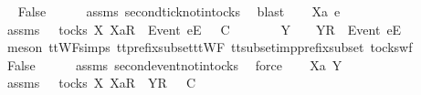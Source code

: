 \ \isamarkupfalse%
\ False\isanewline
\ \ \ \ \isamarkupfalse%
\ assms{\isacharparenleft}{}{\isacharparenright}\ second{\isacharunderscore}tick{\isacharunderscore}notin{\isacharunderscore}tocks\ \isamarkupfalse%
\ blast\isanewline
{}\isamarkupfalse%
\isanewline
\ \ \isamarkupfalse%
\ Xa\ e\ {\isasymrho}\ {\isasymsigma}\isanewline
\ \ \isamarkupfalse%
\ assms{\isacharcolon}\ {\isachardoublequoteopen}{\isasymsigma}\ {\isasymin}\ tocks\ X{\isachardoublequoteclose}\ {\isachardoublequoteopen}{\isacharbrackleft}Xa{\isacharbrackright}\isactrlsub R\ {\isacharhash}\ {\isacharbrackleft}Event\ e{\isacharbrackright}\isactrlsub E\ {\isacharhash}\ {\isasymrho}\ {\isasymsubseteq}\isactrlsub C\ {\isasymsigma}{\isachardoublequoteclose}\isanewline
\ \ \isamarkupfalse%
\ \isamarkupfalse%
\ {\isasymsigma}{\isacharprime}\ Y\ \ {\isachardoublequoteopen}{\isasymsigma}\ {\isacharequal}\ {\isacharbrackleft}Y{\isacharbrackright}\isactrlsub R\ {\isacharhash}\ {\isacharbrackleft}Event\ e{\isacharbrackright}\isactrlsub E\ {\isacharhash}\ {\isasymsigma}{\isacharprime}{\isachardoublequoteclose}\isanewline
\ \ \ \ \isamarkupfalse%
\ {\isacharparenleft}meson\ ttWF{\isachardot}simps{\isacharparenleft}{}{}{\isacharparenright}\ tt{\isacharunderscore}prefix{\isacharunderscore}subset{\isacharunderscore}ttWF\ tt{\isacharunderscore}subset{\isacharunderscore}imp{\isacharunderscore}prefix{\isacharunderscore}subset\ tocks{\isacharunderscore}wf{\isacharparenright}\isanewline
\ \ \isamarkupfalse%
\ \isamarkupfalse%
\ False\isanewline
\ \ \ \ \isamarkupfalse%
\ assms{\isacharparenleft}{}{\isacharparenright}\ second{\isacharunderscore}event{\isacharunderscore}notin{\isacharunderscore}tocks\ \isamarkupfalse%
\ force\isanewline
{}\isamarkupfalse%
\isanewline
\ \ \isamarkupfalse%
\ Xa\ Y\ {\isasymrho}\ {\isasymsigma}\isanewline
\ \ \isamarkupfalse%
\ assms{\isacharcolon}\ {\isachardoublequoteopen}{\isasymsigma}\ {\isasymin}\ tocks\ X{\isachardoublequoteclose}\ {\isachardoublequoteopen}{\isacharbrackleft}Xa{\isacharbrackright}\isactrlsub R\ {\isacharhash}\ {\isacharbrackleft}Y{\isacharbrackright}\isactrlsub R\ {\isacharhash}\ {\isasymrho}\ {\isasymsubseteq}\isactrlsub C\ {\isasymsigma}{\isachardoublequoteclose}\isanewline
\ \ \isamarkupfalse%
\ \isamarkupfalse%
